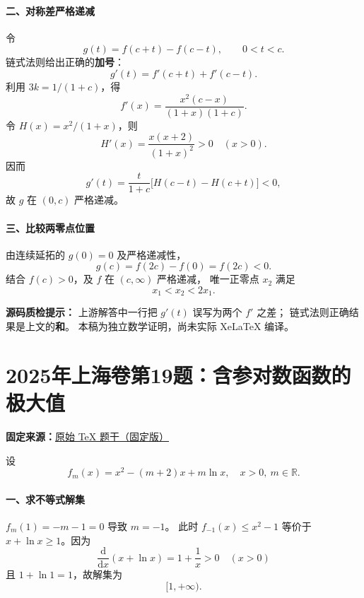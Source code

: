 \documentclass[UTF8,a4paper,11pt]{ctexart}
\begin{document}
\paragraph{二、对称差严格递减}
令
\[
g(t)=f(c+t)-f(c-t),\qquad 0<t<c.
\]
链式法则给出正确的\textbf{加号}：
\[
g'(t)=f'(c+t)+f'(c-t).
\]
利用 $3k=1/(1+c)$，得
\[
f'(x)=\frac{x^2(c-x)}{(1+x)(1+c)}.
\]
令 $H(x)=x^2/(1+x)$，则
\[
H'(x)=\frac{x(x+2)}{(1+x)^2}>0\quad(x>0).
\]
因而
\[
g'(t)=\frac{t}{1+c}\bigl[H(c-t)-H(c+t)\bigr]<0,
\]
故 $g$ 在 $(0,c)$ 严格递减。

\paragraph{三、比较两零点位置}
由连续延拓的 $g(0)=0$ 及严格递减性，
\[
g(c)=f(2c)-f(0)=f(2c)<0.
\]
结合 $f(c)>0$，及 $f$ 在 $(c,\infty)$ 严格递减，
唯一正零点 $x_2$ 满足
\[
\boxed{x_1<x_2<2x_1}.
\]

\bigskip
\noindent\textbf{源码质检提示：}
上游解答中一行把 $g'(t)$ 误写为两个 $f'$ 之差；
链式法则正确结果是上文的\textbf{和}。
本稿为独立数学证明，尚未实际 XeLaTeX 编译。

\clearpage
{}
{}
\section*{2025年上海卷第19题：含参对数函数的极大值}
\noindent\textbf{固定来源：}\href{https://github.com/DxAThing/Gaokao-Math-Problems-Compilation/blob/f1ae169b58a75b3db6e35c670b3f0d5c78718188/content/2025/shanghai.tex#L381}{原始 TeX 题干（固定版）}

设
\[
 f_m(x)=x^2-(m+2)x+m\ln x,\quad x>0,\ m\in\mathbb R.
\]
\paragraph{一、求不等式解集}
$f_m(1)=-m-1=0$ 导致 $m=-1$。
此时 $f_{-1}(x)\le x^2-1$ 等价于
$x+\ln x\ge1$。因为
\[
\frac{\mathrm d}{\mathrm dx}(x+\ln x)=1+\frac1x>0
\quad(x>0)
\]
且 $1+\ln1=1$，故解集为
\[
\boxed{[1,+\infty)}.
\]
\end{document}
